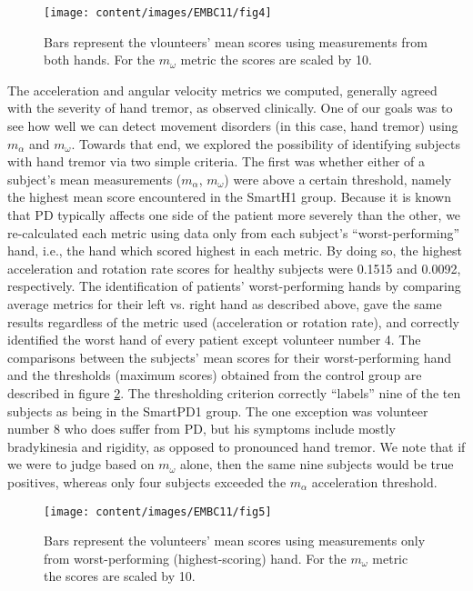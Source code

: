 \begin{figure}[h]
	\centering
	\texttt{[image: content/images/EMBC11/fig4]}
	\caption{Bars represent the vlounteers' mean scores using measurements from both hands. For the $m_{\omega}$ metric the scores are scaled by 10.}
	\label{fig:bars1}
\end{figure}

The acceleration and angular velocity metrics we computed, generally agreed with the severity of hand tremor, as observed clinically. One of our goals was to see how well we can detect movement disorders (in this case, hand tremor) using $m_{\alpha}$ and $m_{\omega}$. Towards that end, we explored the possibility of identifying subjects with hand tremor via two simple criteria. The first was whether either of a subject's mean measurements ($m_{\alpha}$, $m_{\omega}$) were above a certain threshold, namely the highest mean score encountered in the \gls{SmartH1} group. Because it is known that \gls{PD} typically affects one side of the patient more severely than the other, we re-calculated each metric using data only from each subject's ``worst-performing'' hand, i.e., the hand which scored highest in each metric. By doing so, the highest acceleration and rotation rate scores for healthy subjects were 0.1515 and 0.0092, respectively. The identification of patients’ worst-performing hands by comparing average metrics for their left vs. right hand as described above, gave the same results regardless of the metric used (acceleration or rotation rate), and correctly identified the worst hand of every patient except volunteer number 4. The comparisons between the subjects' mean scores for their worst-performing hand and the thresholds (maximum scores) obtained from the control group are described in figure \ref{fig:bars2}. The thresholding criterion correctly ``labels'' nine of the ten subjects as being in the \gls{SmartPD1} group. The one exception was volunteer number 8 who does suffer from \gls{PD}, but his symptoms include mostly bradykinesia and rigidity, as opposed to pronounced hand tremor. We note that if we were to judge based on  $m_{\omega}$ alone, then the same nine subjects would be true positives, whereas only four subjects exceeded the $m_{\alpha}$ acceleration threshold. 

\begin{figure}[h]
	\centering
	\texttt{[image: content/images/EMBC11/fig5]}
	\caption{Bars represent the volunteers' mean scores using measurements only from worst-performing (highest-scoring) hand. For the $m_{\omega}$ metric the scores are scaled by 10.}
	\label{fig:bars2}
\end{figure}

